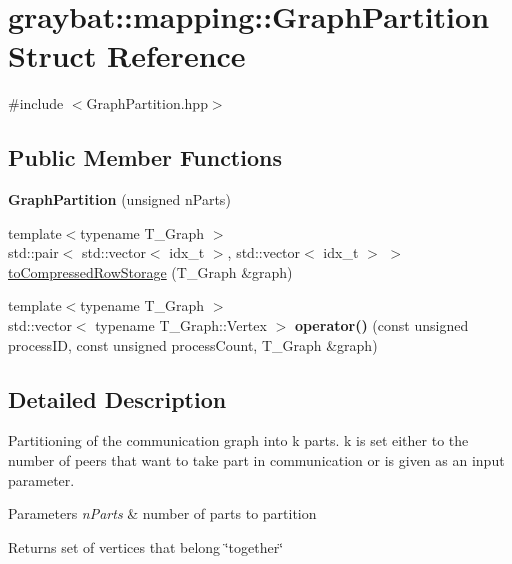 \hypertarget{structgraybat_1_1mapping_1_1GraphPartition}{}\section{graybat\+:\+:mapping\+:\+:Graph\+Partition Struct Reference}
\label{structgraybat_1_1mapping_1_1GraphPartition}


{\ttfamily \#include $<$Graph\+Partition.\+hpp$>$}

\subsection*{Public Member Functions}
\begin{DoxyCompactItemize}
\item 
\hypertarget{structgraybat_1_1mapping_1_1GraphPartition_afeeafb75cddcbb05ba2f6d3d3b662f49}{}{\bfseries Graph\+Partition} (unsigned n\+Parts)\label{structgraybat_1_1mapping_1_1GraphPartition_afeeafb75cddcbb05ba2f6d3d3b662f49}

\item 
{\footnotesize template$<$typename T\+\_\+\+Graph $>$ }\\std\+::pair$<$ std\+::vector$<$ idx\+\_\+t $>$, std\+::vector$<$ idx\+\_\+t $>$ $>$ \hyperlink{structgraybat_1_1mapping_1_1GraphPartition_a917b54b6d70ef3890d1a756fdd97fa6a}{to\+Compressed\+Row\+Storage} (T\+\_\+\+Graph \&graph)
\item 
\hypertarget{structgraybat_1_1mapping_1_1GraphPartition_a952baf3f1cbcec52d3296d7acdb912ff}{}{\footnotesize template$<$typename T\+\_\+\+Graph $>$ }\\std\+::vector$<$ typename T\+\_\+\+Graph\+::\+Vertex $>$ {\bfseries operator()} (const unsigned process\+I\+D, const unsigned process\+Count, T\+\_\+\+Graph \&graph)\label{structgraybat_1_1mapping_1_1GraphPartition_a952baf3f1cbcec52d3296d7acdb912ff}

\end{DoxyCompactItemize}


\subsection{Detailed Description}
Partitioning of the communication graph into k parts. k is set either to the number of peers that want to take part in communication or is given as an input parameter.


\begin{DoxyParams}{Parameters}
{\em n\+Parts} & number of parts to partition \\
\hline
\end{DoxyParams}
\begin{DoxyReturn}{Returns}
set of vertices that belong \char`\"{}together\char`\"{} 
\end{DoxyReturn}


